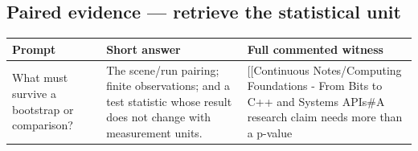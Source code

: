 \subsection{Paired evidence --- retrieve the statistical unit}\label{appendix-cb5af353ef77-paired-evidence-retrieve-the-statistical-unit}

{\def\LTcaptype{none} %
\begin{longtable}[]{@{}
  >{\raggedright\arraybackslash}p{}
  >{\raggedright\arraybackslash}p{}
  >{\raggedright\arraybackslash}p{}@{}}
\toprule\noalign{}
\begin{minipage}[b]{\linewidth}\raggedright
Prompt
\end{minipage} & \begin{minipage}[b]{\linewidth}\raggedright
Short answer
\end{minipage} & \begin{minipage}[b]{\linewidth}\raggedright
Full commented witness
\end{minipage} \\
\midrule\noalign{}
\endhead
\bottomrule\noalign{}
\endlastfoot
What must survive a bootstrap or comparison? & The scene/run pairing; finite observations; and a test statistic whose result does not change with measurement units. & {[}{[}Continuous Notes/Computing Foundations - From Bits to C++ and Systems APIs\#A research claim needs more than a p-value \\
\end{longtable}
}
